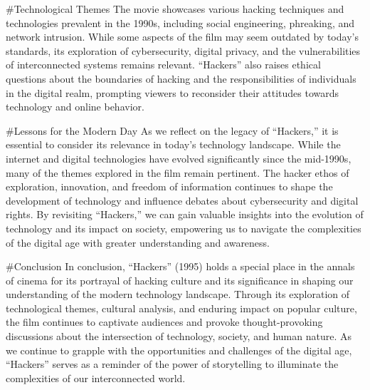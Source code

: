 \documentclass[
  openany]{book}
\begin{document}
\#Technological Themes
The movie showcases various hacking techniques and technologies prevalent in the 1990s, including social engineering, phreaking, and network intrusion. While some aspects of the film may seem outdated by today's standards, its exploration of cybersecurity, digital privacy, and the vulnerabilities of interconnected systems remains relevant. ``Hackers'' also raises ethical questions about the boundaries of hacking and the responsibilities of individuals in the digital realm, prompting viewers to reconsider their attitudes towards technology and online behavior.

\#Lessons for the Modern Day
As we reflect on the legacy of ``Hackers,'' it is essential to consider its relevance in today's technology landscape. While the internet and digital technologies have evolved significantly since the mid-1990s, many of the themes explored in the film remain pertinent. The hacker ethos of exploration, innovation, and freedom of information continues to shape the development of technology and influence debates about cybersecurity and digital rights. By revisiting ``Hackers,'' we can gain valuable insights into the evolution of technology and its impact on society, empowering us to navigate the complexities of the digital age with greater understanding and awareness.

\#Conclusion
In conclusion, ``Hackers'' (1995) holds a special place in the annals of cinema for its portrayal of hacking culture and its significance in shaping our understanding of the modern technology landscape. Through its exploration of technological themes, cultural analysis, and enduring impact on popular culture, the film continues to captivate audiences and provoke thought-provoking discussions about the intersection of technology, society, and human nature. As we continue to grapple with the opportunities and challenges of the digital age, ``Hackers'' serves as a reminder of the power of storytelling to illuminate the complexities of our interconnected world.
\end{document}
